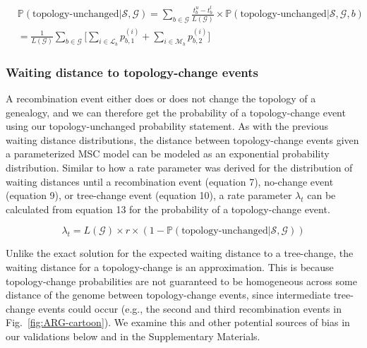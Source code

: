 \documentclass[11pt]{article}
\begin{document}
\begin{equation}
\begin{aligned}
	&\mathbb{P}(\textrm{topology-unchanged} | \mathcal{S},\mathcal{G})
	= \sum_{b \in \mathcal{G}}\frac{t_b^u - t_b^l}{L(\mathcal{G})} 
	\times 
	\mathbb{P}(\textrm{topology-unchanged} | \mathcal{S},\mathcal{G},b)
	\\
	&
	= \frac{1}{L(\mathcal{G})} \sum_{b \in \mathcal{G}}
	\bigg[ 
		\sum_{i \in \mathcal{L}_b} p_{b,1}^{(i)} +
		\sum_{i \in \mathcal{M}_b} p_{b,2}^{(i)}
	\bigg]
\end{aligned}
\end{equation}

\subsubsection{Waiting distance to topology-change events}
A recombination event either does or does not change the topology
of a genealogy, and we can therefore get the probability of a 
topology-change event using our topology-unchanged probability statement.
As with the previous waiting distance distributions, the distance between
topology-change events given a parameterized MSC model can be 
modeled as an exponential probability distribution. 
Similar to how a rate parameter was derived for the distribution 
of waiting distances until a recombination event (equation 7), 
no-change event (equation 9), or tree-change event (equation 10), 
a rate parameter $\lambda_t$ can be calculated from equation 13 for 
the probability of a topology-change event. 

\begin{equation}
	\lambda_{t} = 
	L(\mathcal{G}) \times r \times 
	(1 - \mathbb{P}(\text{topology-unchanged} | \mathcal{S},\mathcal{G}))
\end{equation}


Unlike the exact solution for the expected waiting distance to a  
tree-change, the waiting distance for a topology-change is an
approximation. This is because topology-change probabilities are not 
guaranteed to be homogeneous across some distance of the genome between 
topology-change events, since intermediate tree-change events could occur
(e.g., the second and third recombination events in Fig.~\ref{fig:ARG-cartoon}).
We examine this and other potential sources of bias in our validations
below and in the Supplementary Materials.
\end{document}
